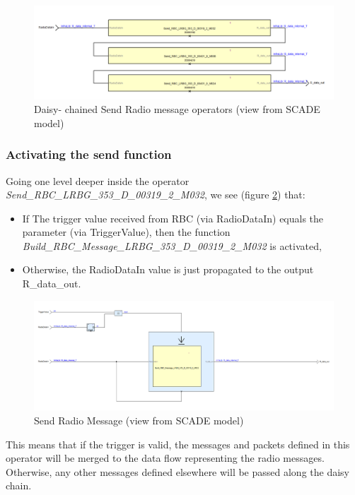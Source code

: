\documentclass{template/openetcs_article}
\begin{document}
\begin{figure}[H]
  \centering
  \includegraphics[width=\textwidth]{images/rbcchain}
   \caption{Daisy- chained Send Radio message operators (view from SCADE model)}
  \label{fig:rbcchain}
\end{figure}
\subsubsection{Activating the send function}
Going one level deeper inside the operator \emph{Send\_RBC\_LRBG\_353\_D\_00319\_2\_M032}, we see (figure \ref{fig:sendRM}) that:
\begin{itemize}
 \item If The trigger value received from RBC (via RadioDataIn) equals the parameter (via TriggerValue), then the function \emph{Build\_RBC\_Message\_LRBG\_353\_D\_00319\_2\_M032} is activated,
 \item Otherwise, the RadioDataIn value is just propagated to the output R\_data\_out.
\end{itemize}
\begin{figure}[H]
  \centering
  \includegraphics[width=\textwidth]{images/sendRM}
   \caption{Send Radio Message (view from SCADE model)}
  \label{fig:sendRM}
\end{figure}
This means that if the trigger is valid, the messages and packets defined in this operator will be merged to the data flow representing the radio messages. Otherwise, any other messages defined elsewhere will be passed along the daisy chain.\newline
\end{document}
